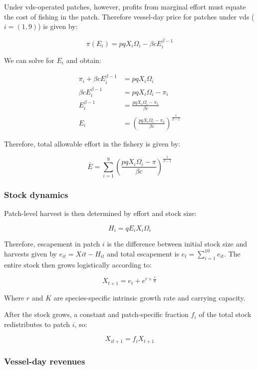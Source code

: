 \documentclass[12pt]{article}
\begin{document}
Under vds-operated patches, however, profits from marginal effort must equate the cost of fishing in the patch. Therefore vessel-day price for patches under vds ($i = (1, 9)$) is  given by:

$$
\pi(E_i) = pqX_i\Omega_i - \beta c E_i ^{\beta - 1}
$$

We can solve for $E_i$ and obtain:

\begin{equation}
	\begin{split}
		\pi_i + \beta c E_i ^{\beta - 1} &= pqX_i\Omega_i \\
		\beta c E_i ^{\beta - 1} &= pqX_i\Omega_i - \pi_i \\
		E_i ^{\beta - 1} &= \frac{pqX_i\Omega_i - \pi_1}{\beta c} \\
		E_i &= \left(\frac{pqX_i\Omega_i - \pi_1}{\beta c }\right) ^ {\frac{1}{\beta - 1}}
	\end{split}
\label{eqn:demands}
\end{equation}

Therefore, total allowable effort in the fishery is given by:

$$
\bar{E} = \sum_{i = 1}^9\left(\frac{pqX_i\Omega_i - \pi}{\beta c }\right) ^ {\frac{1}{\beta - 1}}
\label{eqn:Ebar}
$$

\subsubsection{Stock dynamics}

Patch-level harvest is then determined by effort and stock size:

$$
H_i = qE_iX_i\Omega_i
\label{eqn:harvest}
$$

Therefore, escapement in patch $i$ is the difference between initial stock size and harvests given by $e_{it} = X{it} - H_{it}$ and total escapement is $e_t=\sum_{i=1}^{10}e_{it}$. The entire stock then grows logistically according to:

$$
X_{t+1} = e_t + e^{r \times \frac{e}{K}}
\label{eqn:grow}
$$

Where $r$ and $K$ are species-specific intrinsic growth rate and carrying capacity.

After the stock grows, a constant and patch-specific fraction $f_i$ of the total stock redistributes to patch $i$, so:

$$
X_{it+1} = f_iX_{t+1}
\label{eqn:disperse}
$$

\subsubsection{Vessel-day revenues}
\end{document}
